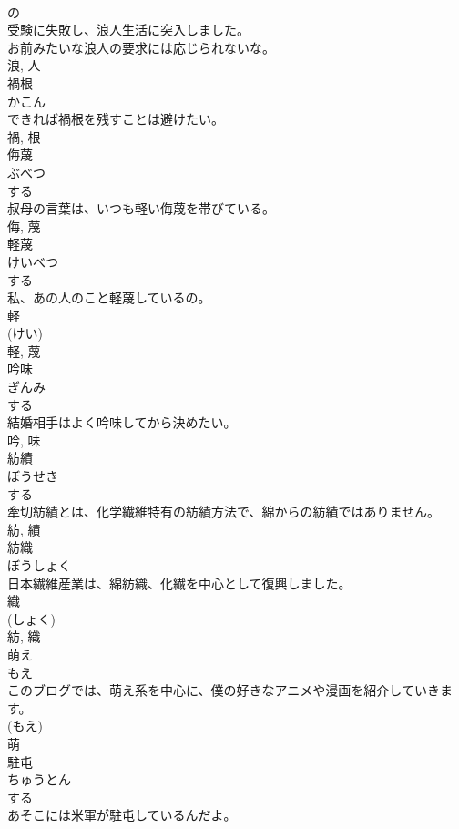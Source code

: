 \documentclass[8pt]{extreport}
\begin{document}
\begin{CJK}{UTF8}{min}
\\	の 
\\	受験に失敗し、浪人生活に突入しました。	
\\	お前みたいな浪人の要求には応じられないな。	
\\	浪, 人	
\\	禍根	
\\	かこん	
\\	できれば禍根を残すことは避けたい。	
\\	禍, 根	
\\	侮蔑	
\\	ぶべつ	
\\	する 
\\	叔母の言葉は、いつも軽い侮蔑を帯びている。	
\\	侮, 蔑	
\\	軽蔑	
\\	けいべつ	
\\	する 
\\	私、あの人のこと軽蔑しているの。	
\\	軽 
\\	(けい) 
\\	軽, 蔑	
\\	吟味	
\\	ぎんみ	
\\	する 
\\	結婚相手はよく吟味してから決めたい。	
\\	吟, 味	
\\	紡績	
\\	ぼうせき	
\\	する 
\\	牽切紡績とは、化学繊維特有の紡績方法で、綿からの紡績ではありません。	
\\	紡, 績	
\\	紡織	
\\	ぼうしょく	
\\	日本繊維産業は、綿紡織、化繊を中心として復興しました。	
\\	織 
\\	(しょく) 
\\	紡, 織	
\\	萌え	
\\	もえ	
\\	このブログでは、萌え系を中心に、僕の好きなアニメや漫画を紹介していきます。	
\\	(もえ) 
\\	萌	
\\	駐屯	
\\	ちゅうとん	
\\	する 
\\	あそこには米軍が駐屯しているんだよ。	

\end{CJK}
\end{document}
